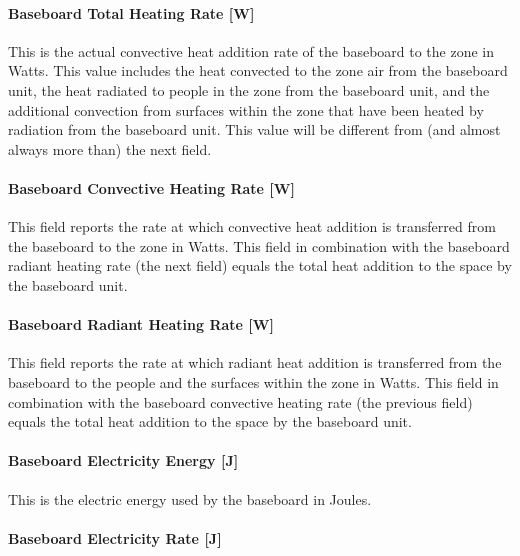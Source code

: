 \paragraph{Baseboard Total Heating Rate {[}W{]}}\label{baseboard-total-heating-rate-w-2}

This is the actual convective heat addition rate of the baseboard to the zone in Watts. This value includes the heat convected to the zone air from the baseboard unit, the heat radiated to people in the zone from the baseboard unit, and the additional convection from surfaces within the zone that have been heated by radiation from the baseboard unit. This value will be different from (and almost always more than) the next field.

\paragraph{Baseboard Convective Heating Rate {[}W{]}}\label{baseboard-convective-heating-rate-w-2}

This field reports the rate at which convective heat addition is transferred from the baseboard to the zone in Watts.  This field in combination with the baseboard radiant heating rate (the next field) equals the total heat addition to the space by the baseboard unit.

\paragraph{Baseboard Radiant Heating Rate {[}W{]}}\label{baseboard-radiant-heating-rate-w-2}

This field reports the rate at which radiant heat addition is transferred from the baseboard to the people and the surfaces within the zone in Watts.  This field in combination with the baseboard convective heating rate (the previous field) equals the total heat addition to the space by the baseboard unit.

\paragraph{Baseboard Electricity Energy {[}J{]}}\label{baseboard-electric-energy-j-000}

This is the electric energy used by the baseboard in Joules.

\paragraph{Baseboard Electricity Rate {[}J{]}}\label{baseboard-electric-power-j}

